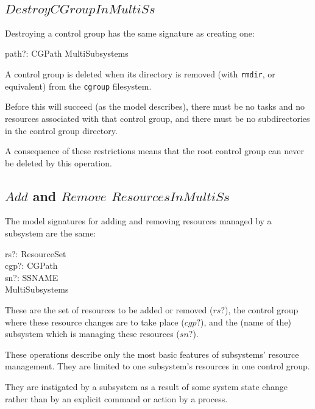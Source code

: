 \documentclass[a4paper,twoside,12pt]{article}
\begin{document}
\subsection{$DestroyCGroupInMultiSs$}

Destroying a control group has the same signature as creating one:
\begin{schema*}
    path?: CGPath
\also 
    \Delta MultiSubsystems
\end{schema*}
A control group is deleted when its directory is removed (with \texttt{rmdir}, or equivalent) from the 
\texttt{cgroup} filesystem.

Before this will succeed (as the model describes), there must be no tasks and no resources 
associated with that control group,
and there must be no subdirectories in the control group directory.

A consequence of these restrictions means that the root control group can never be deleted by this operation.

\subsection{$Add$ and $Remove$ $ResourcesInMultiSs$}

The model signatures for adding and removing resources managed by a subsystem are the same:

\begin{schema*}
    rs?: ResourceSet \\
    cgp?: CGPath \\
    sn?: SSNAME \\
\also
    \Delta MultiSubsystems
\end{schema*}
These are the set of resources to be added or removed ($rs?$), the control group where these resource changes are to take place ($cgp?$), and the (name of the) subsystem which is managing these resources ($sn?$).

These operations describe only the most basic features of subsystems' resource management.
They are limited to one subsystem's resources in one control group.

They are instigated by a subsystem as a result of some system state change rather 
than by an explicit command or action by a process.


\end{document}
